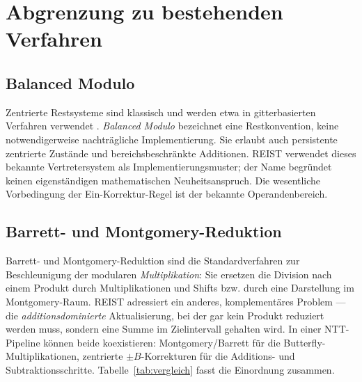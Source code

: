 \documentclass[11pt,a4paper]{scrartcl}
\theoremstyle{definition}
\theoremstyle{plain}
\theoremstyle{remark}
\begin{document}
\section{Abgrenzung zu bestehenden Verfahren}
\label{sec:abgrenzung}

\subsection{Balanced Modulo}

Zentrierte Restsysteme sind klassisch \cite{niven,knuth} und werden etwa in gitterbasierten Verfahren verwendet \cite{kyber,dilithium}. \emph{Balanced Modulo} bezeichnet eine Restkonvention, keine notwendigerweise nachträgliche Implementierung. Sie erlaubt auch persistente zentrierte Zustände und bereichsbeschränkte Additionen. REIST verwendet dieses bekannte Vertretersystem als Implementierungsmuster; der Name begründet keinen eigenständigen mathematischen Neuheitsanspruch. Die wesentliche Vorbedingung der Ein-Korrektur-Regel ist der bekannte Operandenbereich.

\subsection{Barrett- und Montgomery-Reduktion}

Barrett- \cite{barrett} und Montgomery-Reduktion \cite{montgomery} sind die Standardverfahren zur Beschleunigung der modularen \emph{Multiplikation}: Sie ersetzen die Division nach einem Produkt durch Multiplikationen und Shifts bzw. durch eine Darstellung im Montgomery-Raum. REIST adressiert ein anderes, komplementäres Problem --- die \emph{additionsdominierte} Aktualisierung, bei der gar kein Produkt reduziert werden muss, sondern eine Summe im Zielintervall gehalten wird. In einer NTT-Pipeline können beide koexistieren: Montgomery/Barrett für die Butterfly-Multiplikationen, zentrierte $\pm B$-Korrekturen für die Additions- und Subtraktionsschritte. Tabelle~\ref{tab:vergleich} fasst die Einordnung zusammen.
\end{document}
